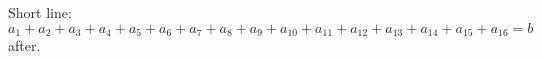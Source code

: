 \documentclass[10pt]{article}
\begin{document}
Short line:
\begin{equation} a_1 + a_2 + a_3 + a_4 + a_5 + a_6 + a_7 + a_8 + a_9 + a_{10} + a_{11} + a_{12} + a_{13} + a_{14} + a_{15} + a_{16} = b \end{equation}
after.
\end{document}
